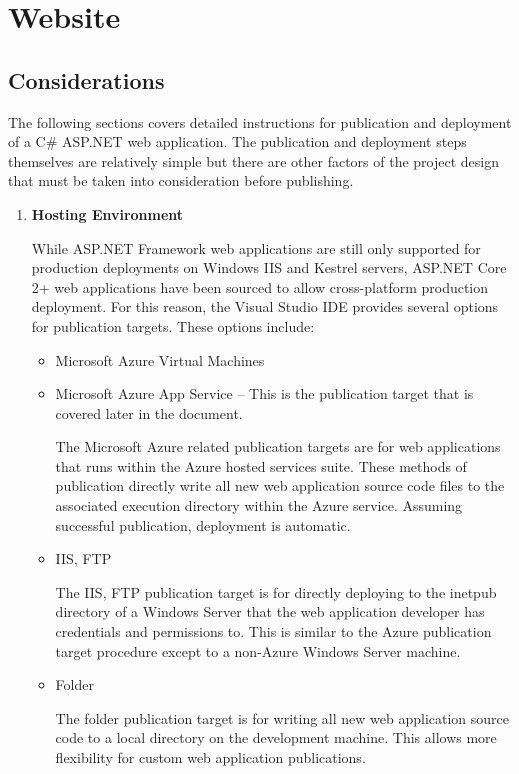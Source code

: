 
\section{Website}
\subsection{Considerations}

The following sections covers detailed instructions for publication and deployment of a C\# ASP.NET web application. The publication and deployment steps themselves are relatively simple but there are other factors of the project design that must be taken into consideration before publishing.  

\begin{enumerate}
    \item \textbf{Hosting Environment}

    While ASP.NET Framework web applications are still only supported for production deployments on Windows IIS and Kestrel servers, ASP.NET Core 2+ web applications have been sourced to allow cross-platform production deployment. For this reason, the Visual Studio IDE provides several options for publication targets. These options include:

    \begin{itemize}
        \item Microsoft Azure Virtual Machines
        \item Microsoft Azure App Service -- This is the publication target that is covered later in the document.
        
        The Microsoft Azure related publication targets are for web applications that  runs within the Azure hosted services suite. These methods of publication directly write all new web application source code files to the associated execution directory within the Azure service.  Assuming successful publication, deployment is automatic.
        
        \item IIS, FTP
        
        The IIS, FTP publication target is for directly deploying to the inetpub directory of a Windows Server that the web application developer has credentials and permissions to.  This is similar to the Azure publication target procedure except to a non-Azure Windows Server machine.
        
        \item Folder
        
        The folder publication target is for writing all new web application source code to a local directory on the development machine. This allows more flexibility for custom web application publications.
    \end{itemize}
\end{enumerate}

